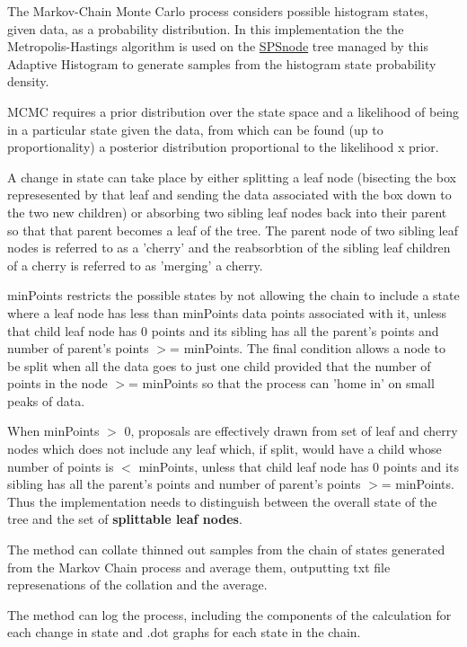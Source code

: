 \-The \-Markov-\/\-Chain \-Monte \-Carlo process considers possible histogram states, given data, as a probability distribution. \-In this implementation the the \-Metropolis-\/\-Hastings algorithm is used on the \hyperlink{classsubpavings_1_1SPSnode}{\-S\-P\-Snode} tree managed by this \-Adaptive \-Histogram to generate samples from the histogram state probability density.

\-M\-C\-M\-C requires a prior distribution over the state space and a likelihood of being in a particular state given the data, from which can be found (up to proportionality) a posterior distribution proportional to the likelihood x prior.

\-A change in state can take place by either splitting a leaf node (bisecting the box represesented by that leaf and sending the data associated with the box down to the two new children) or absorbing two sibling leaf nodes back into their parent so that that parent becomes a leaf of the tree. \-The parent node of two sibling leaf nodes is referred to as a 'cherry' and the reabsorbtion of the sibling leaf children of a cherry is referred to as 'merging' a cherry.

min\-Points restricts the possible states by not allowing the chain to include a state where a leaf node has less than min\-Points data points associated with it, unless that child leaf node has 0 points and its sibling has all the parent's points and number of parent's points $>$= min\-Points. \-The final condition allows a node to be split when all the data goes to just one child provided that the number of points in the node $>$= min\-Points so that the process can 'home in' on small peaks of data.

\-When min\-Points $>$ 0, proposals are effectively drawn from set of leaf and cherry nodes which does not include any leaf which, if split, would have a child whose number of points is $<$ min\-Points, unless that child leaf node has 0 points and its sibling has all the parent's points and number of parent's points $>$= min\-Points. \-Thus the implementation needs to distinguish between the overall state of the tree and the set of {\bfseries splittable leaf nodes}.

\-The method can collate thinned out samples from the chain of states generated from the \-Markov \-Chain process and average them, outputting txt file represenations of the collation and the average.

\-The method can log the process, including the components of the calculation for each change in state and .dot graphs for each state in the chain.


